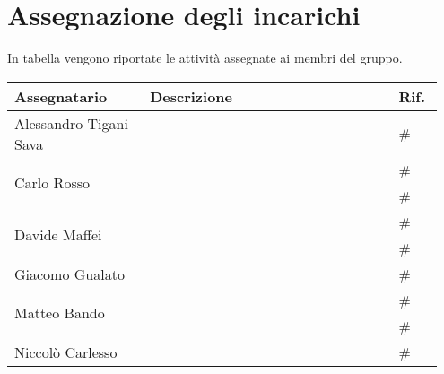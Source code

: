 \section{Assegnazione degli incarichi}
In tabella vengono riportate le attività assegnate ai membri del gruppo.
\begin{center}
    {
    \renewcommand{\arraystretch}{1.5}
    \begin{tabular}{p{0.30\linewidth}|p{0.55\linewidth}|p{0.10\linewidth}}
		\textbf{Assegnatario}   		&   \textbf{Descrizione}   & \textbf{Rif.}     \\
		\hline
		Alessandro Tigani Sava  		&	& \# 	\\
		\hline
		\multirow{2}{*}{Carlo Rosso}	&	& \# 	\\
		\cline{2-3}
										&	& \# 	\\
		\hline
		\multirow{2}{*}{Davide Maffei}	&	& \# 	\\
		\cline{2-3}
										&	& \# 	\\
		\hline
		Giacomo Gualato					&	& \# 	\\
		\hline
		\multirow{2}{*}{Matteo Bando}	&	& \# 	\\
		\cline{2-3}
										& 	& \# 	\\
		\hline
		Niccolò Carlesso				&	& \# 	\\
    \end{tabular}
    }
\end{center}